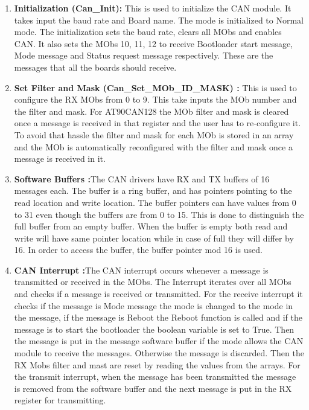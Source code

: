 \begin{enumerate}
\item \textbf{Initialization (Can\_Init):} This is used to initialize the CAN module. It takes input the baud rate and Board name. The mode is initialized to Normal mode. The initialization sets the baud rate, clears all MObs and enables CAN. It also sets the MObs 10, 11, 12 to receive Bootloader start message, Mode message and Status request message respectively. These are the messages that all the boards should receive.
\item \textbf{Set Filter and Mask (Can\_Set\_MOb\_ID\_MASK) :} This is used to configure the RX MObs from 0 to 9. This take inputs the MOb number and the filter and mask. For AT90CAN128 the MOb filter and mask is cleared once a message is received in that register and the user has to re-configure it. To avoid that hassle the filter and mask for each MOb is stored in an array and the MOb is automatically reconfigured with the filter and mask once a message is received in it.
\item \textbf{Software Buffers :}The CAN drivers have RX and TX buffers of 16 messages each. The buffer is a ring buffer, and has pointers pointing to the read location and write location. The buffer pointers can have values from 0 to 31 even though the buffers are from 0 to 15. This is done to distinguish the full buffer from an empty buffer. When the buffer is empty both read and write will have same pointer location while in case of full they will differ by 16. In order to access the buffer, the buffer pointer mod 16 is used. 
\item \textbf{CAN Interrupt :}The CAN interrupt occurs whenever a message is transmitted or received in the MObs. The Interrupt iterates over all MObs and checks if a message is received or transmitted. \newline
For the receive interrupt it checks if the message is Mode message the mode is changed to the mode in the message, if the message is Reboot the Reboot function is called and if the message is to start the bootloader the boolean variable is set to True. Then the message is put in the message software buffer if the mode allows the CAN module to receive the messages. Otherwise the message is discarded. Then the RX Mobs filter and mast are reset by reading the values from the arrays.\newline
For the transmit interrupt, when the message has been transmitted the message is removed from the software buffer and the next message is put in the RX register for transmitting.

\end{enumerate}
